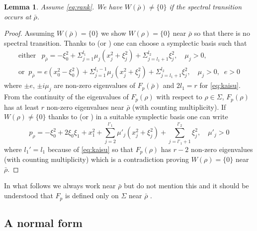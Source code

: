 \documentclass[12pt,leqno]{article} %
\def\bro{\bar\rho}
\def\bro{\bar\rho}
\numberwithin{equation}{section}
\newtheorem{lem}{Lemma}[section]
\begin{document}
%
\begin{lem}
\label{lem:seni:a}Assume  \eqref{eq:rank}. We have $W(\bro)\neq \{0\}$ if the spectral transition occurs at $\bro$.
\end{lem}
%
\begin{proof}Assuming $W(\bro)=\{0\}$ we show $W(\rho)=\{0\}$ near $\bro$ so that there is no
spectral transition. Thanks to \cite[Theorem 1.4.6]{MR492751} (or \cite[Theorem 21.5.3]{MR781536}) one can choose a symplectic basis such that
%
\begin{gather*}
\text{either}\;\;\;p_{\bro}=-\xi_0^2+\Sigma_{j=1}^{l_1}\mu_j(x_j^2+\xi_j^2)+\Sigma_{j=l_1+1}^{l_2}\xi_j^2,\quad \mu_j>0,\\
\text{or}\;\; p_{\bro}=e(x_0^2-\xi_0^2)+\Sigma_{j=1}^{l_1-1}\mu_j(x_j^2+\xi_j^2)+\Sigma_{j=l_1+1}^{l_2}\xi_j^2,\quad \mu_j>0,\;\;e>0
\end{gather*}
%
where $\pm e$, $\pm i\mu_j$ are non-zero eigenvalues of $F_p(\bro)$ and $2l_1=r$ for \eqref{eq:kaisu}. From the continuity of the eigenvalues of $F_p(\rho)$ with respect to $\rho\in\Sigma$, $F_p(\rho)$ has at least $r$ non-zero eigenvalues near $\bro$ (with counting multiplicity). If $W(\rho)\neq \{0\}$ thanks to \cite[Theorem 1.4.6]{MR492751} (or \cite[Theorem 21.5.3]{MR781536}) in a suitable symplectic basis one can write
%
\[
p_{\rho}=-\xi_0^2+2\xi_0\xi_1+x_1^2+\sum_{j=2}^{l'_1}\mu'_j(x_j^2+\xi_j^2)+\sum_{j=l'_1+1}^{l'_2}\xi_j^2,\quad \mu'_j>0
\]
%
where $l_1'=l_1$ because of \eqref{eq:kaisu} so that $F_p(\rho)$ has $r-2$ non-zero eigenvalues (with counting multiplicity) which is a contradiction proving $W(\rho)=\{0\}$ near $\bro$.
\end{proof}
\medskip
\noindent
In what follows we always work near $\bro$ but do not mention this and it should be understood that $F_p$ is defined only on $\Sigma$ near $\bro$ .
\subsection{A normal form }
\label{sec:form}
\end{document}

